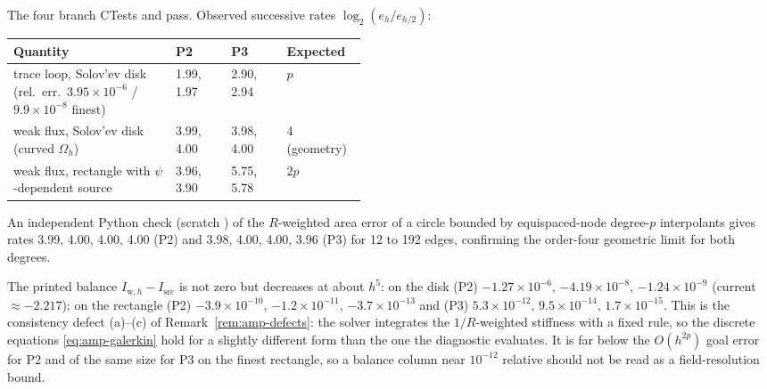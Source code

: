 The four branch CTests  and
 pass. Observed successive
rates $\log_2(e_{h}/e_{h/2})$:

\begin{center}
\begin{tabular}{p{0.46\linewidth}lll}
\toprule
Quantity & P2 & P3 & Expected\\\midrule
trace loop, Solov'ev disk (rel.\ err.\ $3.95\times10^{-6}$ / $9.9\times10^{-8}$ finest) & 1.99, 1.97 & 2.90, 2.94 & $p$\\
weak flux, Solov'ev disk (curved $\Omega_h$) & 3.99, 4.00 & 3.98, 4.00 & 4 (geometry)\\
weak flux, rectangle with $\psi$-dependent source & 3.96, 3.90 & 5.75, 5.78 & $2p$\\
\bottomrule
\end{tabular}
\end{center}

An independent Python check (scratch ) of the $R$-weighted area
error of a circle bounded by equispaced-node degree-$p$ interpolants gives
rates 3.99, 4.00, 4.00, 4.00 (P2) and 3.98, 4.00, 4.00, 3.96 (P3) for 12 to 192
edges, confirming the order-four geometric limit for both degrees.

The printed balance $I_{\mathrm w,h}-I_{\mathrm{src}}$ is not zero but
decreases at about $h^{5}$: on the disk (P2) $-1.27\times10^{-6}$,
$-4.19\times10^{-8}$, $-1.24\times10^{-9}$ (current $\approx-2.217$); on the
rectangle (P2) $-3.9\times10^{-10}$, $-1.2\times10^{-11}$, $-3.7\times10^{-13}$
and (P3) $5.3\times10^{-12}$, $9.5\times10^{-14}$, $1.7\times10^{-15}$. This is
the consistency defect (a)--(c) of Remark~\ref{rem:amp-defects}: the solver
integrates the $1/R$-weighted stiffness with a fixed rule, so the discrete
equations \eqref{eq:amp-galerkin} hold for a slightly different form than the
one the diagnostic evaluates. It is far below the $O(h^{2p})$ goal error for
P2 and of the same size for P3 on the finest rectangle, so a balance column
near $10^{-12}$ relative should not be read as a field-resolution bound.

